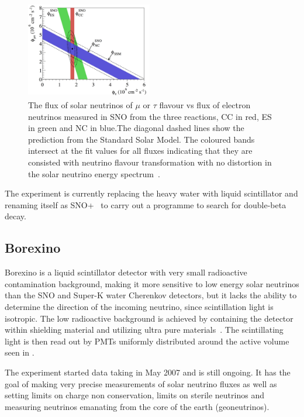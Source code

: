\begin{figure}[h!]
\centering
  \centering
\includegraphics[width=0.49\textwidth]{figures/fixSNO.jpeg}
\vspace{2mm}
\caption{The flux of solar neutrinos of $\mu$ or $\tau$ flavour vs flux of electron neutrinos measured in SNO from the three reactions, CC in red, ES in green and NC in blue.The diagonal dashed lines show the prediction from the Standard Solar Model. The coloured bands intersect at the fit values for all fluxes indicating that they are consisted with neutrino flavour transformation with no distortion in the solar neutrino energy spectrum~\cite{98Ahmad}.}
\label{fig:SNO2}
\end{figure}

The experiment is currently replacing the heavy water with liquid scintillator and renaming itself as SNO+~\cite{42SNO+} to carry out a programme to search for double-beta decay.

\subsection{Borexino}
Borexino is a liquid scintillator detector with very small radioactive contamination background, making it more sensitive to low energy solar neutrinos than the SNO and Super-K water Cherenkov detectors, but it lacks the ability to determine the direction of the incoming neutrino, since scintillation light is isotropic. The low radioactive background is achieved by containing the detector within shielding material and utilizing ultra pure materials~\cite{63Borexino}. The scintillating light is then read out by PMTs uniformly distributed around the active volume seen in .

The experiment started data taking in May 2007 and is still ongoing. It has the goal of making  very precise measurements of solar neutrino fluxes as well as setting limits on charge non conservation, limits on sterile neutrinos and measuring neutrinos emanating from the core of the earth (geoneutrinos).

